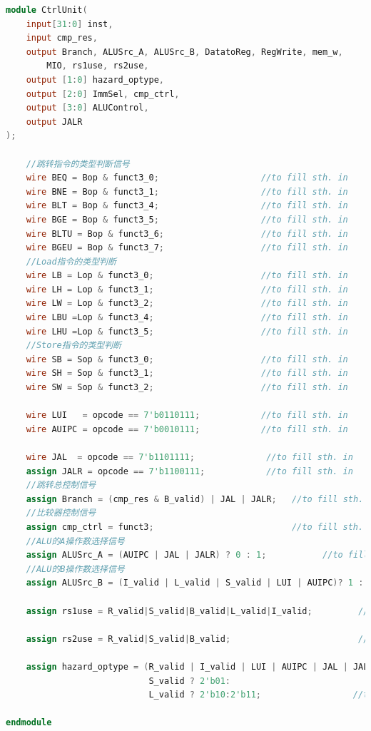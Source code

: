 \begin{lstlisting}[language = {verilog}]
module CtrlUnit(
    input[31:0] inst,
    input cmp_res,
    output Branch, ALUSrc_A, ALUSrc_B, DatatoReg, RegWrite, mem_w,
        MIO, rs1use, rs2use,
    output [1:0] hazard_optype,
    output [2:0] ImmSel, cmp_ctrl,
    output [3:0] ALUControl,
    output JALR
);

    //跳转指令的类型判断信号
    wire BEQ = Bop & funct3_0;                    //to fill sth. in 
    wire BNE = Bop & funct3_1;                    //to fill sth. in 
    wire BLT = Bop & funct3_4;                    //to fill sth. in 
    wire BGE = Bop & funct3_5;                    //to fill sth. in 
    wire BLTU = Bop & funct3_6;                   //to fill sth. in 
    wire BGEU = Bop & funct3_7;                   //to fill sth. in 
    //Load指令的类型判断
    wire LB = Lop & funct3_0;                     //to fill sth. in 
    wire LH = Lop & funct3_1;                     //to fill sth. in 
    wire LW = Lop & funct3_2;                     //to fill sth. in 
    wire LBU =Lop & funct3_4;                     //to fill sth. in 
    wire LHU =Lop & funct3_5;                     //to fill sth. in 
    //Store指令的类型判断
    wire SB = Sop & funct3_0;                     //to fill sth. in 
    wire SH = Sop & funct3_1;                     //to fill sth. in 
    wire SW = Sop & funct3_2;                     //to fill sth. in 
    
    wire LUI   = opcode == 7'b0110111;            //to fill sth. in 
    wire AUIPC = opcode == 7'b0010111;            //to fill sth. in 

    wire JAL  = opcode == 7'b1101111;              //to fill sth. in 
    assign JALR = opcode == 7'b1100111;            //to fill sth. in 
    //跳转总控制信号
    assign Branch = (cmp_res & B_valid) | JAL | JALR;   //to fill sth. in 
    //比较器控制信号
    assign cmp_ctrl = funct3;                           //to fill sth. in 
    //ALU的A操作数选择信号
    assign ALUSrc_A = (AUIPC | JAL | JALR) ? 0 : 1;           //to fill sth. in 
    //ALU的B操作数选择信号
    assign ALUSrc_B = (I_valid | L_valid | S_valid | LUI | AUIPC)? 1 : 0;   //to fill sth. in 

    assign rs1use = R_valid|S_valid|B_valid|L_valid|I_valid;         //to fill sth. in 

    assign rs2use = R_valid|S_valid|B_valid;                         //to fill sth. in 

    assign hazard_optype = (R_valid | I_valid | LUI | AUIPC | JAL | JALR) ? 2'b00:
                            S_valid ? 2'b01:
                            L_valid ? 2'b10:2'b11;                  //to fill sth. in 

endmodule
\end{lstlisting}

